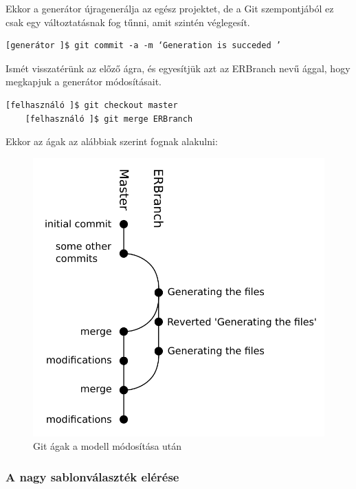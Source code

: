\documentclass[a4paper,12pt,oneside]{report}
\begin{document}
\begin{justify}
	Ekkor a generátor újragenerálja az egész projektet, de a Git szempontjából ez csak egy változtatásnak fog tűnni, amit szintén véglegesít. 

	\begin{lstlisting}[language=GitBash]
	[generátor ]$ git commit -a -m ‘Generation is succeded ’
	\end{lstlisting}

	Ismét visszatérünk az előző ágra, és egyesítjük azt az ERBranch nevű ággal, hogy megkapjuk a generátor módosításait. 

	\begin{lstlisting}[language=GitBash]
	[felhasználó ]$ git checkout master
	[felhasználó ]$ git merge ERBranch
    \end{lstlisting}
    
    Ekkor az ágak az alábbiak szerint fognak alakulni: 
	\begin{figure}[H]
		\includegraphics[width=\textwidth]{contents/images/git_second.png}
		\caption{Git ágak a modell módosítása után}
		\label{fig:git_second}
	\end{figure}

\end{justify}

\newpage
\subsubsection{A nagy sablonválaszték elérése}
\end{document}
